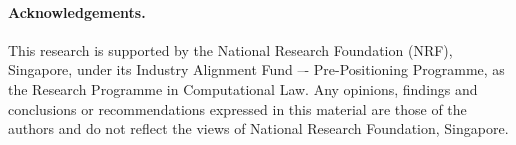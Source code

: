 \documentclass[runningheads]{llncs}
\begin{document}
\paragraph{Acknowledgements.}
This research is supported by the National Research Foundation (NRF),
Singapore, under its Industry Alignment Fund –- Pre-Positioning Programme, as
the Research Programme in Computational Law. Any opinions, findings and
conclusions or recommendations expressed in this material are those of the
authors and do not reflect the views of National Research Foundation,
Singapore.

% 
% 


\end{document}
